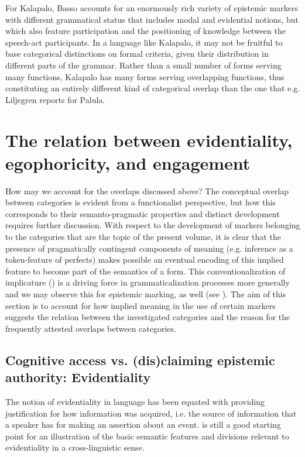 \documentclass[output=paper]{langsci/langscibook}
\begin{document}
For Kalapalo, Basso accounts for an enormously rich variety of epistemic markers with different grammatical status that includes modal and evidential notions, but which also feature participation and the positioning of knowledge between the speech-act participants. In a language like Kalapalo, it may not be fruitful to base categorical distinctions on formal criteria, given their distribution in different parts of the grammar. Rather than a small number of forms serving many functions, Kalapalo has many forms serving overlapping functions, thus constituting an entirely different kind of categorical overlap than the one that e.g. Liljegren reports for Palula.
%
\section{The relation between evidentiality, egophoricity, and engagement}\label{s:hb3}

How may we account for the overlaps discussed above? The conceptual overlap between categories is evident from a functionalist perspective, but how this corresponds to their semanto-pragmatic properties and distinct development requires further discussion. With respect to the development of markers belonging to the categories that are the topic of the present volume, it is clear that the presence of pragmatically contingent components of meaning (e.g. inference as a token-feature of perfects) makes possible an eventual encoding of this implied feature to become part of the semantics of a form. This conventionalization of implicature (\citealt{Levinson2000}) is a driving force in grammaticalization processes more generally and we may observe this for epistemic marking, as well (see \citealt{Bergqvist2018b}). The aim of this section is to account for how implied meaning in the use of certain markers suggests the relation between the investigated categories and the reason for the frequently attested overlaps between categories.
%
\subsection{Cognitive access vs. (dis)claiming epistemic authority: Evidentiality}\label{s:hb3-1}

The notion of evidentiality in language has been equated with providing justification for how information was acquired, i.e. the source of information that a speaker has for making an assertion about an event. \cite{Willett1988} is still a good starting point for an illustration of the basic semantic features and divisions relevant to evidentiality in a cross-linguistic sense. 
\end{document}
